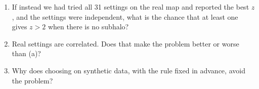 
\begin{enumerate}
  \item If instead we had tried all 31 settings on the real map and reported the best $z$, and the settings were
    independent, what is the chance that at least one gives $z > 2$ when there is no subhalo?
  \item Real settings are correlated. Does that make the problem better or worse than (a)?
  \item Why does choosing on synthetic data, with the rule fixed in advance, avoid the problem?
\end{enumerate}

